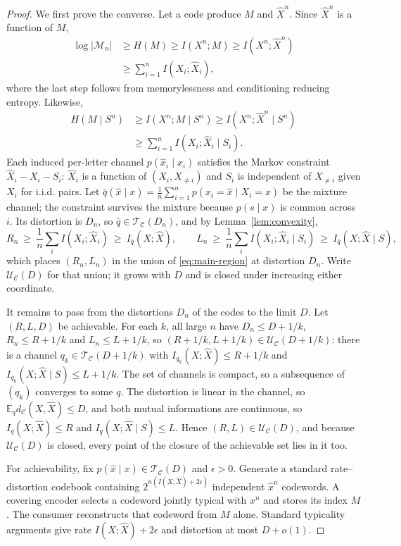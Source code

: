 \documentclass[letterpaper,onecolumn]{IEEEtran}
\theoremstyle{definition}
\theoremstyle{remark}
\newcommand{\E}{\mathbb{E}}
\newcommand{\cC}{\mathcal{C}}
\newcommand{\hX}{\widehat{X}}
\newcommand{\hXn}{\widehat{X}^{n}}
\newcommand{\1}{\mathbf{1}}
\begin{document}
\begin{proof}
We first prove the converse. Let a code produce $M$ and $\hXn$. Since
$\hXn$ is a function of $M$,
\begin{align}
 \log|\mathcal M_n|
 &\ge H(M)\ge I(X^n;M)\ge I(X^n;\hXn)\nonumber\\
 &\ge \sum_{i=1}^{n}I(X_i;\hX_i),
 \label{eq:rate-conv}
\end{align}
where the last step follows from memorylessness and conditioning reducing
entropy. Likewise,
\begin{align}
 H(M\mid S^n)
 &\ge I(X^n;M\mid S^n)
 \ge I(X^n;\hXn\mid S^n)\nonumber\\
 &\ge \sum_{i=1}^{n}I(X_i;\hX_i\mid S_i).
 \label{eq:work-conv}
\end{align}
Each induced per-letter channel $p(\hat x_i\mid x_i)$ satisfies the Markov
constraint $\hX_i-X_i-S_i$: $\hX_i$ is a function of $(X_i,X_{\ne i})$ and
$S_i$ is independent of $X_{\ne i}$ given $X_i$ for i.i.d. pairs. Let
$\bar q(\hat x\mid x)=\frac1n\sum_{i=1}^{n}p(\hat x_i=\hat x\mid X_i=x)$ be
the mixture channel; the constraint survives the mixture because
$p(s\mid x)$ is common across $i$. Its distortion is $D_n$, so
$\bar q\in\mathcal T_{\cC}(D_n)$, and by Lemma~\ref{lem:convexity},
\begin{equation*}
 R_n\ \ge\ \frac1n\sum_i I(X_i;\hX_i)\ \ge\ I_{\bar q}(X;\hX),
 \qquad
 L_n\ \ge\ \frac1n\sum_i I(X_i;\hX_i\mid S_i)\ \ge\ I_{\bar q}(X;\hX\mid S),
\end{equation*}
which places $(R_n,L_n)$ in the union of \eqref{eq:main-region} at
distortion $D_n$. Write $\mathcal U_{\cC}(D)$ for that union; it grows with
$D$ and is closed under increasing either coordinate.

It remains to pass from the distortions $D_n$ of the codes to the limit $D$.
Let $(R,L,D)$ be achievable. For each $k$, all large $n$ have $D_n\le D+1/k$,
$R_n\le R+1/k$ and $L_n\le L+1/k$, so $(R+1/k,L+1/k)\in\mathcal U_{\cC}(D+1/k)$:
there is a channel $q_k\in\mathcal T_{\cC}(D+1/k)$ with
$I_{q_k}(X;\hX)\le R+1/k$ and $I_{q_k}(X;\hX\mid S)\le L+1/k$. The set of
channels is compact, so a subsequence of $(q_k)$ converges to some $q$. The
distortion is linear in the channel, so $\E_q d_{\cC}(X,\hX)\le D$, and both
mutual informations are continuous, so $I_q(X;\hX)\le R$ and
$I_q(X;\hX\mid S)\le L$. Hence $(R,L)\in\mathcal U_{\cC}(D)$, and because
$\mathcal U_{\cC}(D)$ is closed, every point of the closure of the achievable
set lies in it too.

For achievability, fix $p(\hat x\mid x)\in\mathcal T_{\cC}(D)$ and
$\epsilon>0$. Generate a standard rate--distortion codebook containing
$2^{n(I(X;\hX)+2\epsilon)}$ independent $\hat x^n$ codewords. A covering
encoder selects a codeword jointly typical with $x^n$ and stores its index $M$.
The consumer reconstructs that codeword from $M$ alone. Standard typicality
arguments give rate $I(X;\hX)+2\epsilon$ and distortion at most
$D+o(1)$.


\end{proof}
\end{document}
